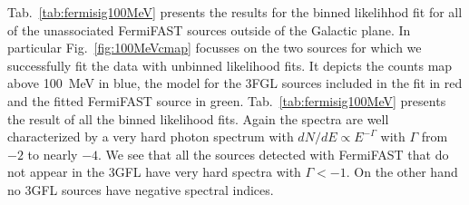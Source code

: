 \documentclass[useAMS,usenatbib]{mn2e}
\begin{document}
Tab.~\ref{tab:fermisig100MeV} presents the results for the binned
likelihhod fit for all of the unassociated FermiFAST sources outside
of the Galactic plane.  In particular Fig.~\ref{fig:100MeVcmap}
focusses on the two sources for which we successfully fit the data
with unbinned likelihood fits.  It depicts the counts map above
100~MeV in blue, the model for the 3FGL sources included in the fit in
red and the fitted FermiFAST source in green.  Tab.~\ref{tab:fermisig100MeV} presents the
result of all the binned likelihood fits. Again the spectra
are well characterized by a very hard photon spectrum with
$dN/dE \propto E^{-\Gamma}$ with $\Gamma$ from $-2$ to nearly $-4$.
We see that all the sources detected with FermiFAST that do not appear
in the 3GFL have very hard spectra with $\Gamma < -1$.  On the other
hand no 3GFL sources have negative spectral indices.
\end{document}
